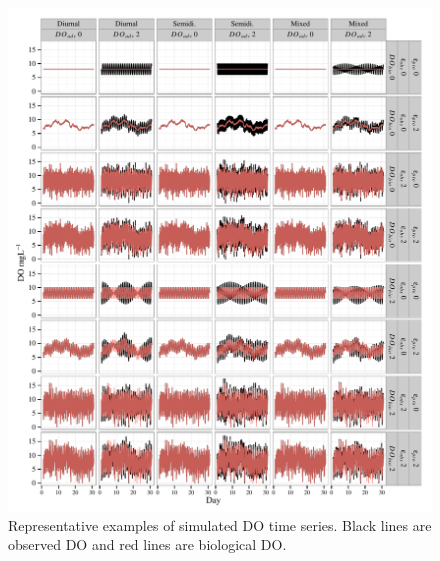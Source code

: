 \documentclass{article}\usepackage[]{graphicx}\usepackage[]{color}
\makeatletter
\def\maxwidth{ %
  \ifdim\Gin@nat@width>\linewidth
    \linewidth
  \else
    \Gin@nat@width
  \fi
}
\newenvironment{knitrout}{}{} %
\makeatother
\begin{document}
\begin{knitrout}
\color{fgcolor}\begin{figure}[!h]


{\centering \includegraphics[width=\maxwidth]{figure/sim_ex} 

}

\caption[Representative examples of simulated DO time series]{Representative examples of simulated DO time series.  Black lines are observed DO and red lines are biological DO.\label{fig:sim_ex}}
\end{figure}


\end{knitrout}
\clearpage
\end{document}
